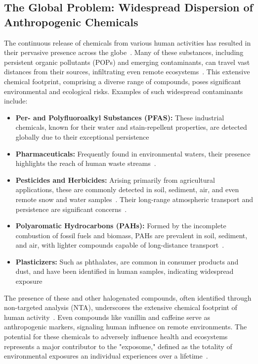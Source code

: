 \documentclass[11pt]{article}
\begin{document}
\begin{doublespace}
    \subsection{The Global Problem: Widespread Dispersion of Anthropogenic Chemicals}
        The continuous release of chemicals from various human activities has resulted in their pervasive presence across the globe~\cite{Manz}.
        Many of these substances, including persistent organic pollutants (POPs) and emerging contaminants, can travel vast distances from their sources, infiltrating even remote ecosystems~\cite{Wenkai}.
        This extensive chemical footprint, comprising a diverse range of compounds, poses significant environmental and ecological risks.
        Examples of such widespread contaminants include:
        \begin{itemize}
            \item \textbf{Per- and Polyfluoroalkyl Substances (PFAS): }{These industrial chemicals, known for their water and stain-repellent properties, are detected globally due to their exceptional persistence~\cite{Manz}}
            \item \textbf{Pharmaceuticals: }{Frequently found in environmental waters, their presence highlights the reach of human waste streams~\cite{Manz}.}
            \item \textbf{Pesticides and Herbicides: }{Arising primarily from agricultural applications, these are commonly detected in soil, sediment, air, and even remote snow and water samples~\cite{Manz}. Their long-range atmospheric transport and persistence are significant concerns~\cite{Wenkai}.}
            \item \textbf{Polyaromatic Hydrocarbons (PAHs): }{Formed by the incomplete combustion of fossil fuels and biomass, PAHs are prevalent in soil, sediment, and air, with lighter compounds capable of long-distance transport~\cite{Manz}.}
            \item \textbf{Plasticizers: }{Such as phthalates, are common in consumer products and dust, and have been identified in human samples, indicating widespread exposure~\cite{Manz}}
        \end{itemize}

    The presence of these and other halogenated compounds, often identified through non-targeted analysis (NTA), underscores the extensive chemical footprint of human activity~\cite{Manz}.
    Even compounds like vanillin and caffeine serve as anthropogenic markers, signaling human influence on remote environments.
    The potential for these chemicals to adversely influence health and ecosystems represents a major contributor to the "exposome," defined as the totality of environmental exposures an individual experiences over a lifetime~\cite{Manz}.


\end{doublespace}
\end{document}
